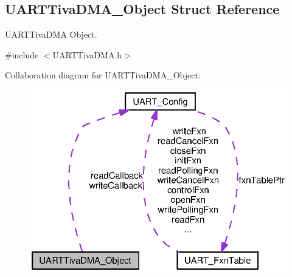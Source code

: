 \subsection{U\-A\-R\-T\-Tiva\-D\-M\-A\-\_\-\-Object Struct Reference}
\label{struct_u_a_r_t_tiva_d_m_a___object}


U\-A\-R\-T\-Tiva\-D\-M\-A Object.  




{\ttfamily \#include $<$U\-A\-R\-T\-Tiva\-D\-M\-A.\-h$>$}



Collaboration diagram for U\-A\-R\-T\-Tiva\-D\-M\-A\-\_\-\-Object\-:
\nopagebreak
\begin{figure}[H]
\begin{center}
\leavevmode
\includegraphics[width=324pt]{struct_u_a_r_t_tiva_d_m_a___object__coll__graph}
\end{center}
\end{figure}
